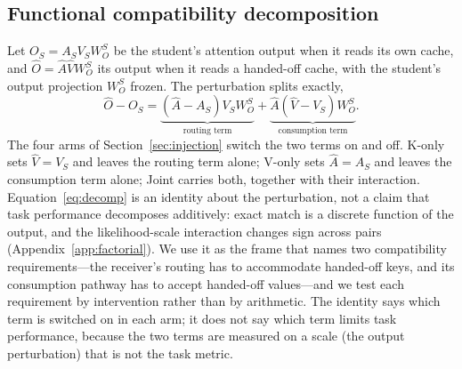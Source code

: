 \documentclass[11pt]{article}
\begin{document}
\subsection{Functional compatibility decomposition}
\label{sec:decomp}
Let $O_S=A_SV_SW_O^S$ be the student's attention output when it reads its own
cache, and $\hat O=\hat A\hat VW_O^S$ its output when it reads a handed-off
cache, with the student's output projection $W_O^S$ frozen. The perturbation
splits exactly,
\begin{equation}
\hat O-O_S
= \underbrace{(\hat A-A_S)V_SW_O^S}_{\text{routing term}}
+ \underbrace{\hat A(\hat V-V_S)W_O^S}_{\text{consumption term}} .
\label{eq:decomp}
\end{equation}
The four arms of Section~\ref{sec:injection} switch the two terms on and off.
K-only sets $\hat V=V_S$ and leaves the routing term alone; V-only sets
$\hat A=A_S$ and leaves the consumption term alone; Joint carries both, together
with their interaction. Equation~\eqref{eq:decomp} is an identity about the
perturbation, not a claim that task performance decomposes additively: exact
match is a discrete function of the output, and the likelihood-scale interaction
changes sign across pairs (Appendix~\ref{app:factorial}). We use it as the frame
that names two compatibility requirements---the receiver's routing has to
accommodate handed-off keys, and its consumption pathway has to accept handed-off
values---and we test each requirement by intervention rather than by arithmetic.
The identity says which term is switched on in each arm; it does not say which
term limits task performance, because the two terms are measured on a scale
(the output perturbation) that is not the task metric.
\end{document}
